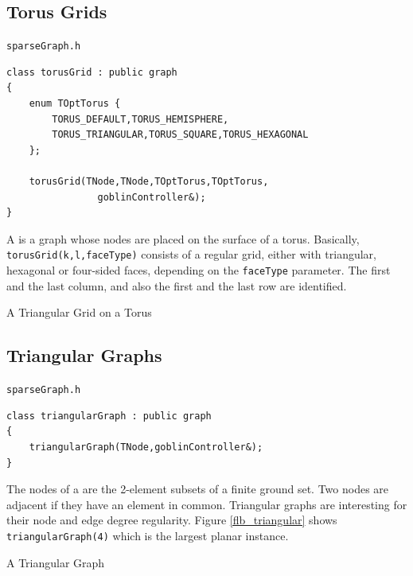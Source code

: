 \documentclass[a4paper,11pt,twoside]{book}
\begin{document}
\begin{multicols}{2}
\subsection{Torus Grids}
\label{slb_torus_grid}
\myinclude\verb/sparseGraph.h/
\begin{mymethods}
\begin{verbatim}
class torusGrid : public graph
{
    enum TOptTorus {
        TORUS_DEFAULT,TORUS_HEMISPHERE,
        TORUS_TRIANGULAR,TORUS_SQUARE,TORUS_HEXAGONAL
    };

    torusGrid(TNode,TNode,TOptTorus,TOptTorus,
                goblinController&);
}
\end{verbatim}
\end{mymethods}
A  is a graph whose nodes are placed on the surface of a torus.
Basically, \verb/torusGrid(k,l,faceType)/ consists of a regular grid, either
with triangular, hexagonal or four-sided faces, depending on the \verb/faceType/
parameter. The first and the last column, and also the first and the last row
are identified.

\bigskip
\begin{figurehere}
\begin{center}
\epsfxsize=8cm
\vspace{0.5cm}
\caption{\label{flb_torus_grid}A Triangular Grid on a Torus}
\end{center}
\end{figurehere}


\subsection{Triangular Graphs}
\myinclude\verb/sparseGraph.h/
\begin{mymethods}
\begin{verbatim}
class triangularGraph : public graph
{
    triangularGraph(TNode,goblinController&);
}
\end{verbatim}
\end{mymethods}
The nodes of a  are the 2-element subsets of a finite
ground set. Two nodes are adjacent if they have an element in common.
Triangular graphs are interesting for their node and edge degree regularity.
Figure \ref{flb_triangular} shows \verb/triangularGraph(4)/ which is the
largest planar instance.

\bigskip
\begin{figurehere}
\begin{center}
\epsfxsize=7cm
\vspace{0.5cm}
\caption{\label{flb_triangular}A Triangular Graph}
\end{center}
\end{figurehere}



\end{multicols}
\end{document}
